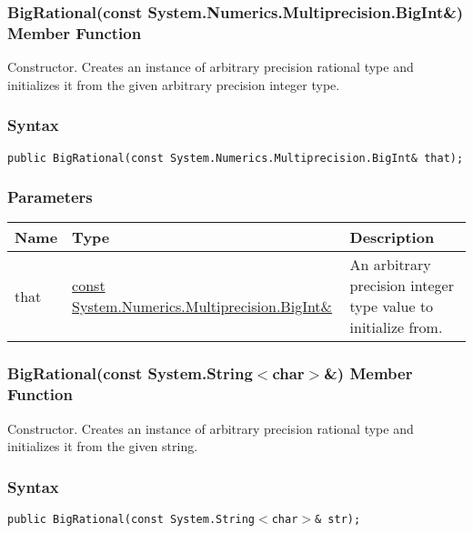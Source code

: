 \documentclass[a4paper,oneside,11.000000pt]{book}
\begin{document}
\hypertarget{System.Numerics.Multiprecision.BigRational.constructor.P.System.Numerics.Multiprecision.BigRational.C.R.System.Numerics.Multiprecision.BigInt}{\subsubsection*{BigRational(const System.Numerics.Multiprecision.BigInt\&) Member Function}}
\begin{flushleft}
Constructor. Creates an instance of arbitrary precision rational type and initializes it from the given arbitrary precision integer type.

\end{flushleft}
\subsubsection*{Syntax}
\texttt{public BigRational(const System.Numerics.Multiprecision.BigInt\& that);}
\subsubsection*{Parameters}
\begin{flushleft}
\begin{supertabular}[l]{!{\raggedright}p{1.30721cm}!{\raggedright}p{8.55945cm}!{\raggedright}p{4.93333cm}}
\textbf{Name}
& \textbf{Type}
& \textbf{Description}
\\
\hline
that
& \hyperlink{System.Numerics.Multiprecision.BigInt}{const System.\-Numerics.\-Multiprecision.\-BigInt\&\-}
& An arbitrary precision integer type value to initialize from.

\\
\end{supertabular}

\end{flushleft}
\clearpage

\hypertarget{System.Numerics.Multiprecision.BigRational.constructor.P.System.Numerics.Multiprecision.BigRational.C.R.System.String.char}{\subsubsection*{BigRational(const System.String$<$char$>$\&) Member Function}}
\begin{flushleft}
Constructor. Creates an instance of arbitrary precision rational type and initializes it from the given string.

\end{flushleft}
\subsubsection*{Syntax}
\texttt{public BigRational(const System.String$<$char$>$\& str);}
\end{document}

